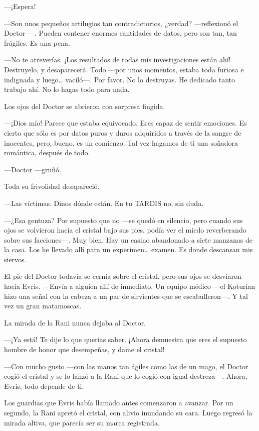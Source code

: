 ---¡Espera!

---Son unos pequeños artilugios tan contradictorios, ¿verdad?
---reflexionó el Doctor--- . Pueden contener enormes cantidades de
datos, pero son tan, tan frágiles. Es una pena.

---No te atreverías. ¡Los resultados de todas mis investigaciones están
ahí! Destruyelo, y desaparecerá. Todo ---por unos momentos, estaba toda
furiosa e indignada y luego\ldots{} vaciló---. Por favor. No lo
destruyas. He dedicado tanto trabajo ahí. No lo hagas todo para nada.

Los ojos del Doctor se abrieron con sorpresa fingida.

---¡Dios mío! Parece que estaba equivocado. Eres capaz de sentir
emociones. Es cierto que sólo es por datos puros y duros adquiridos a
través de la sangre de inocentes, pero, bueno, es un comienzo. Tal vez
hagamos de ti una soñadora romántica, después de todo.

---Doctor ---gruñó.

Toda su frivolidad desapareció.

---Las víctimas. Dinos dónde están. En tu TARDIS no, sin duda.

---¿Esa gentuza? Por supuesto que no ---se quedó en silencio, pero
cuando sus ojos se volvieron hacia el cristal bajo sus pies, podía ver
el miedo reverberando sobre sus facciones---. Muy bien. Hay un casino
abandonado a siete manzanas de la casa. Los he llevado allí para un
experimen\ldots{} examen. Es donde descansan mis siervos.

El pie del Doctor todavía se cernía sobre el cristal, pero sus ojos se
desviaron hacia Evris. ---Envía a alguien allí de inmediato. Un equipo
médico ---el Koturian hizo una señal con la cabeza a un par de
sirvientes que se escabulleron---. Y tal vez un gran matamoscas.

La mirada de la Rani nunca dejaba al Doctor.

---¡Ya está! Te dije lo que querías saber. ¡Ahora demuestra que eres el
supuesto hombre de honor que desempeñas, y dame el cristal!

---Con mucho gusto ---con las manos tan ágiles como las de un mago, el
Doctor cogió el cristal y se lo lanzó a la Rani que lo cogió con igual
destreza---. Ahora, Evris, todo depende de ti.

Los guardias que Evris había llamado antes comenzaron a avanzar. Por un
segundo, la Rani apretó el cristal, con alivio inundando su cara. Luego
regresó la mirada altiva, que parecía ser su marca registrada.

